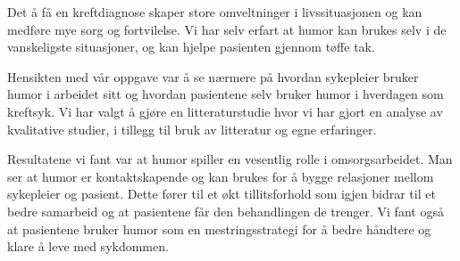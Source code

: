 Det å få en kreftdiagnose skaper store omveltninger i livssituasjonen og kan
medføre mye sorg og fortvilelse. Vi har selv erfart at humor kan brukes selv i
de vanskeligste situasjoner, og kan hjelpe pasienten gjennom tøffe tak.

Hensikten med vår oppgave var å se nærmere på hvordan sykepleier bruker humor i
arbeidet sitt og hvordan pasientene selv bruker humor i hverdagen som kreftsyk.
Vi har valgt å gjøre en litteraturstudie hvor vi har gjort en analyse av
kvalitative studier, i tillegg til bruk av litteratur og egne erfaringer.

Resultatene vi fant var at humor spiller en vesentlig rolle i omsorgsarbeidet.
Man ser at humor er kontaktskapende og kan brukes for å bygge relasjoner mellom
sykepleier og pasient. Dette fører til et økt tillitsforhold som igjen bidrar
til et bedre samarbeid og at pasientene får den behandlingen de trenger. Vi
fant også at pasientene bruker humor som en mestringsstrategi for å bedre
håndtere og klare å leve med sykdommen.
